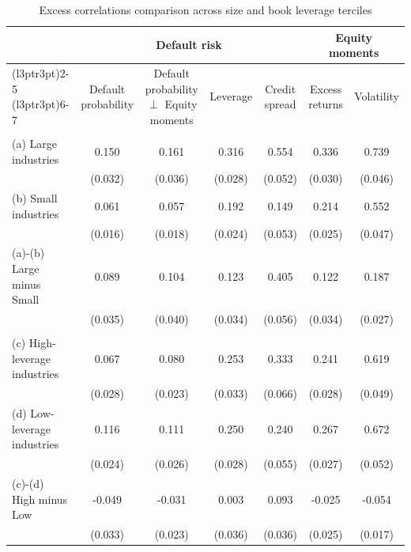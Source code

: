 \begin{table}

\caption{\label{tab:table-oa9}Excess correlations comparison across size and book leverage terciles}
\centering
\begin{tabular}[t]{lcccccc}
\toprule
\multicolumn{1}{c}{ } & \multicolumn{4}{c}{Default risk} & \multicolumn{2}{c}{Equity moments} \\
\cmidrule(l{3pt}r{3pt}){2-5} \cmidrule(l{3pt}r{3pt}){6-7}
  & Default probability & Default probability $\perp$ Equity moments & Leverage & Credit spread & Excess returns & Volatility\\
\midrule
\addlinespace[0.3em]
\multicolumn{7}{l}{\textbf{Panel A: Excess Correlation by Industry Size}}\\
\hspace{1em}(a) Large industries & 0.150 & 0.161 & 0.316 & 0.554 & 0.336 & 0.739\\
\hspace{1em} & (0.032) & (0.036) & (0.028) & (0.052) & (0.030) & (0.046)\\
\hspace{1em}(b) Small industries & 0.061 & 0.057 & 0.192 & 0.149 & 0.214 & 0.552\\
\hspace{1em} & (0.016) & (0.018) & (0.024) & (0.053) & (0.025) & (0.047)\\
\hspace{1em}(a)-(b) Large minus Small & 0.089 & 0.104 & 0.123 & 0.405 & 0.122 & 0.187\\
\hspace{1em} & (0.035) & (0.040) & (0.034) & (0.056) & (0.034) & (0.027)\\
\addlinespace[0.3em]
\multicolumn{7}{l}{\textbf{Panel B: Excess Correlation by Book Leverage}}\\
\hspace{1em}(c) High-leverage industries & 0.067 & 0.080 & 0.253 & 0.333 & 0.241 & 0.619\\
\hspace{1em} & (0.028) & (0.023) & (0.033) & (0.066) & (0.028) & (0.049)\\
\hspace{1em}(d) Low-leverage industries & 0.116 & 0.111 & 0.250 & 0.240 & 0.267 & 0.672\\
\hspace{1em} & (0.024) & (0.026) & (0.028) & (0.055) & (0.027) & (0.052)\\
\hspace{1em}(c)-(d) High minus Low & -0.049 & -0.031 & 0.003 & 0.093 & -0.025 & -0.054\\
\hspace{1em} & (0.033) & (0.023) & (0.036) & (0.036) & (0.025) & (0.017)\\
\bottomrule
\end{tabular}
\end{table}
